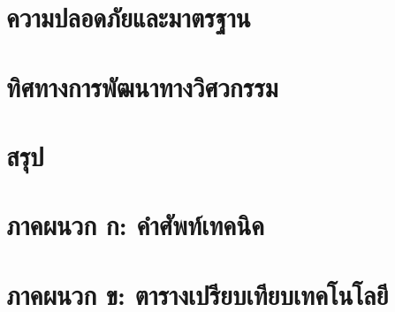 \documentclass[a4paper]{article}
\begin{document}
\section{ความปลอดภัยและมาตรฐาน}

\section{ทิศทางการพัฒนาทางวิศวกรรม}

\section{สรุป}

\printbibliography[title=เอกสารอ้างอิง]

\appendix
\section{ภาคผนวก ก: คำศัพท์เทคนิค}

\section{ภาคผนวก ข: ตารางเปรียบเทียบเทคโนโลยี}
\end{document}
